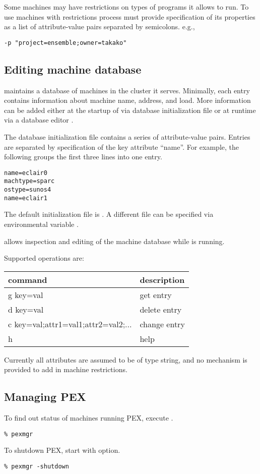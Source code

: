 Some machines may have restrictions on types of programs it
allows to run.  To use machines with restrictions process must provide
specification of its properties as a list of attribute-value pairs
separated by semicolons.  e.g.,
\begin{verbatim}
-p "project=ensemble;owner=takako"
\end{verbatim}


\subsection{Editing machine database}
 maintains a database of machines in the cluster
it serves.  Minimally, each entry contains information about
machine name, address, and load.  More information can be added either
at the startup of  via database initialization file
or at runtime via a database editor .

The database initialization file contains a series of attribute-value
pairs.  Entries are separated by specification of the key attribute
``name''.  For example, the following groups the first three lines
into one entry.
\begin{verbatim}
name=eclair0
machtype=sparc
ostype=sunos4
name=eclair1
\end{verbatim}
The default initialization file is .
A different file can be specified via environmental variable
.


 allows inspection and editing of the machine database
while  is running.

Supported operations are:
\begin{center}
\begin{tabular}{|l|l|}				   \hline
command					& description	\\ \hline \hline
g key=val				& get entry \\
d key=val				& delete entry \\
c key=val;attr1=val1;attr2=val2;...	& change entry \\
h					& help \\ \hline
\end{tabular}
\end{center}

Currently all attributes are assumed to be of type string,
and no mechanism is provided to add in machine restrictions.

\subsection{Managing PEX}
To find out status of machines running PEX, execute
.
\begin{verbatim}
% pexmgr
\end{verbatim}

To shutdown PEX, start 
with  option.
\begin{verbatim}
% pexmgr -shutdown
\end{verbatim}
